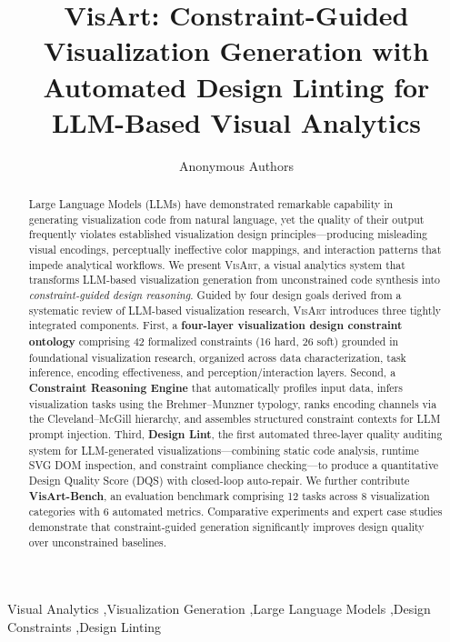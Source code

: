 \documentclass[final,5p,times,twocolumn]{elsarticle}
\newcommand{\sysname}{\textsc{VisArt}}
\begin{document}
\begin{frontmatter}
\title{VisArt: Constraint-Guided Visualization Generation with Automated Design Linting for LLM-Based Visual Analytics}
\author{Anonymous Authors}

\begin{abstract}
Large Language Models (LLMs) have demonstrated remarkable capability in generating visualization code from natural language, yet the quality of their output frequently violates established visualization design principles---producing misleading visual encodings, perceptually ineffective color mappings, and interaction patterns that impede analytical workflows. We present \sysname{}, a visual analytics system that transforms LLM-based visualization generation from unconstrained code synthesis into \textit{constraint-guided design reasoning}. Guided by four design goals derived from a systematic review of LLM-based visualization research, \sysname{} introduces three tightly integrated components. First, a \textbf{four-layer visualization design constraint ontology} comprising 42 formalized constraints (16 hard, 26 soft) grounded in foundational visualization research, organized across data characterization, task inference, encoding effectiveness, and perception/interaction layers. Second, a \textbf{Constraint Reasoning Engine} that automatically profiles input data, infers visualization tasks using the Brehmer--Munzner typology, ranks encoding channels via the Cleveland--McGill hierarchy, and assembles structured constraint contexts for LLM prompt injection. Third, \textbf{Design Lint}, the first automated three-layer quality auditing system for LLM-generated visualizations---combining static code analysis, runtime SVG DOM inspection, and constraint compliance checking---to produce a quantitative Design Quality Score (DQS) with closed-loop auto-repair. We further contribute \textbf{VisArt-Bench}, an evaluation benchmark comprising 12 tasks across 8 visualization categories with 6 automated metrics. Comparative experiments and expert case studies demonstrate that constraint-guided generation significantly improves design quality over unconstrained baselines.
\end{abstract}

\begin{keyword}
Visual Analytics \sep Visualization Generation \sep Large Language Models \sep Design Constraints \sep Design Linting
\end{keyword}
\end{frontmatter}
\end{document}
